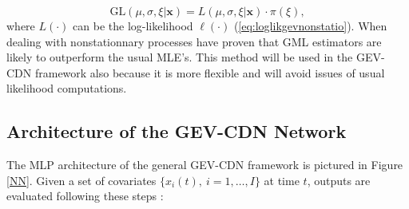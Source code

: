 \begin{equation}\label{eq:gml}
\text{GL}(\mu, \sigma,\xi|\boldsymbol{x})=L(\mu,\sigma,\xi|\boldsymbol{x})\cdot \pi(\xi),
\end{equation}
where $L(\cdot)$ can be the log-likelihood $\ell(\cdot)$ (\ref{eq:loglikgevnonstatio}).
When dealing with nonstationnary processes \cite{el_adlouni_generalized_2007} have proven that GML estimators are likely to outperform the usual MLE's. This method will be used in the GEV-CDN framework also because it is more flexible and will avoid issues of usual likelihood computations.


\subsection{Architecture of the GEV-CDN Network}



The MLP architecture of the general GEV-CDN framework is pictured in Figure \ref{NN}. Given a set of covariates $\big\{x_i(t), \ i=1,\ldots,I\big\}$ at time $t$, outputs are evaluated following these steps :

